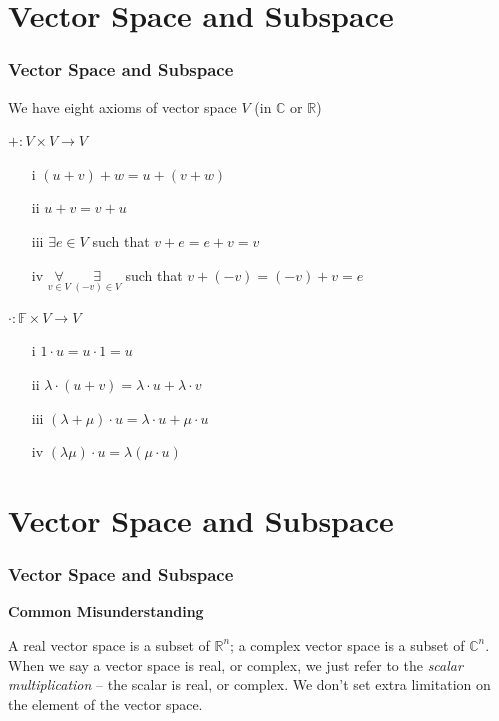 \documentclass[12pt, t]{beamer}
\renewcommand{\emph}[1]{{\color{Turquoise3}\textsl{#1}}}
\begin{document}
\section{Vector Space and Subspace}
\begin{frame}
    \frametitle{Vector Space and Subspace}

We have eight axioms of vector space $V$ (in $\mathbb{C}$ or $\mathbb{R}$)\\

\begin{center}
    \emph{\center $+:V\times V\rightarrow V$}
\end{center}

\begin{enumerate}
    \item[i]    $(u+v)+w=u+(v+w)$
    \item[ii]   $u+v=v+u$
    \item[iii]  $\exists e\in V$ such that $v+e=e+v=v$
    \item[iv]   $\underset{v\in V}{\forall}\ \underset{(-v)\in V}{\exists}$ such that $v+(-v)=(-v)+v=e$
\end{enumerate}

\begin{center}
    \emph{\center $\cdot:\mathbb{F}\times V\rightarrow V$}
\end{center}

\begin{enumerate}
    \item[i]    $1\cdot u=u\cdot 1=u$
    \item[ii]   $\lambda\cdot(u+v)=\lambda\cdot u+\lambda\cdot v$
    \item[iii]  $(\lambda+\mu)\cdot u=\lambda\cdot u+\mu\cdot u$
    \item[iv]   $(\lambda\mu)\cdot u=\lambda(\mu\cdot u)$
\end{enumerate}

\end{frame}


\section{Vector Space and Subspace}
\begin{frame}
    \frametitle{Vector Space and Subspace}
\begin{center}
    \center \textbf{Common Misunderstanding}
\end{center}
\vspace{1em} 
A real vector space is a subset of $\mathbb{R}^n$; a complex vector space is a subset of $\mathbb{C}^n$.\\
\vspace{1em}
\hspace{1em}
When we say a vector space is real, or complex, we just refer to the \emph{scalar multiplication} – the scalar is real, or complex. We don’t set extra limitation on the element of the vector space.

\end{frame}
\end{document}
